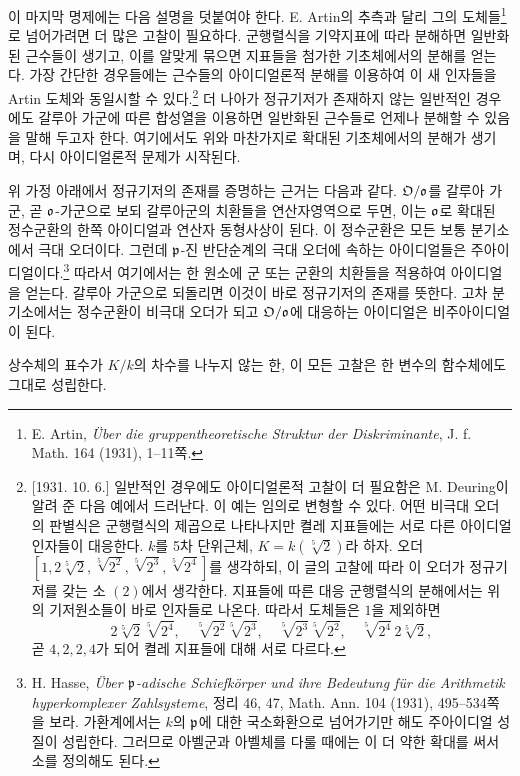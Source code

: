 이 마지막 명제에는 다음 설명을 덧붙여야 한다. E. Artin의 추측과 달리 그의 도체들\footnote{E. Artin, \emph{Über die gruppentheoretische Struktur der Diskriminante}, J. f. Math. 164 (1931), 1--11쪽.}로 넘어가려면 더 많은 고찰이 필요하다. 군행렬식을 기약지표에 따라 분해하면 일반화된 근수들이 생기고, 이를 알맞게 묶으면 지표들을 첨가한 기초체에서의 분해를 얻는다. 가장 간단한 경우들에는 근수들의 아이디얼론적 분해를 이용하여 이 새 인자들을 Artin 도체와 동일시할 수 있다.\footnote{[1931. 10. 6.] 일반적인 경우에도 아이디얼론적 고찰이 더 필요함은 M. Deuring이 알려 준 다음 예에서 드러난다. 이 예는 임의로 변형할 수 있다. 어떤 비극대 오더의 판별식은 군행렬식의 제곱으로 나타나지만 켤레 지표들에는 서로 다른 아이디얼인자들이 대응한다. \(k\)를 5차 단위근체, \(K=k(\sqrt[5]{2})\)라 하자. 오더 \([1,2\sqrt[5]{2},\sqrt[5]{2^2},\sqrt[5]{2^3},\sqrt[5]{2^4}]\)를 생각하되, 이 글의 고찰에 따라 이 오더가 정규기저를 갖는 소 \((2)\)에서 생각한다. 지표들에 따른 대응 군행렬식의 분해에서는 위의 기저원소들이 바로 인자들로 나온다. 따라서 \glqq{}도체\grqq{}들은 \(1\)을 제외하면
\[
2\sqrt[5]{2}\sqrt[5]{2^4},\quad
\sqrt[5]{2^2}\sqrt[5]{2^3},\quad
\sqrt[5]{2^3}\sqrt[5]{2^2},\quad
\sqrt[5]{2^4}\,2\sqrt[5]{2},
\]
곧 \(4,2,2,4\)가 되어 켤레 지표들에 대해 서로 다르다.}
더 나아가 정규기저가 존재하지 않는 일반적인 경우에도 \glqq{}갈루아 가군에 따른 합성열\grqq{}을 이용하면 일반화된 근수들로 언제나 분해할 수 있음을 말해 두고자 한다. 여기에서도 위와 마찬가지로 확대된 기초체에서의 분해가 생기며, 다시 아이디얼론적 문제가 시작된다.

위 가정 아래에서 정규기저의 존재를 증명하는 근거는 다음과 같다. \(\mathfrak O/\mathfrak o\)를 갈루아 가군, 곧 \(\mathfrak o\)-가군으로 보되 갈루아군의 치환들을 연산자영역으로 두면, 이는 \(\mathfrak o\)로 확대된 정수군환의 한쪽 아이디얼과 연산자 동형사상이 된다. 이 정수군환은 모든 보통 분기소에서 극대 오더이다. 그런데 \(\mathfrak p\)-진 반단순계의 극대 오더에 속하는 아이디얼들은 주아이디얼이다.\footnote{H. Hasse, \emph{Über \(\mathfrak p\)-adische Schiefkörper und ihre Bedeutung für die Arithmetik hyperkomplexer Zahlsysteme}, 정리 46, 47, Math. Ann. 104 (1931), 495--534쪽을 보라. 가환계에서는 \(k\)의 \(\mathfrak p\)에 대한 국소화환으로 넘어가기만 해도 주아이디얼 성질이 성립한다. 그러므로 아벨군과 아벨체를 다룰 때에는 이 더 약한 확대를 써서 소를 정의해도 된다.} 따라서 여기에서는 한 원소에 군 또는 군환의 치환들을 적용하여 아이디얼을 얻는다. 갈루아 가군으로 되돌리면 이것이 바로 정규기저의 존재를 뜻한다. 고차 분기소에서는 정수군환이 비극대 오더가 되고 \(\mathfrak O/\mathfrak o\)에 대응하는 아이디얼은 비주아이디얼이 된다.

상수체의 표수가 \(K/k\)의 차수를 나누지 않는 한, 이 모든 고찰은 한 변수의 함수체에도 그대로 성립한다.

